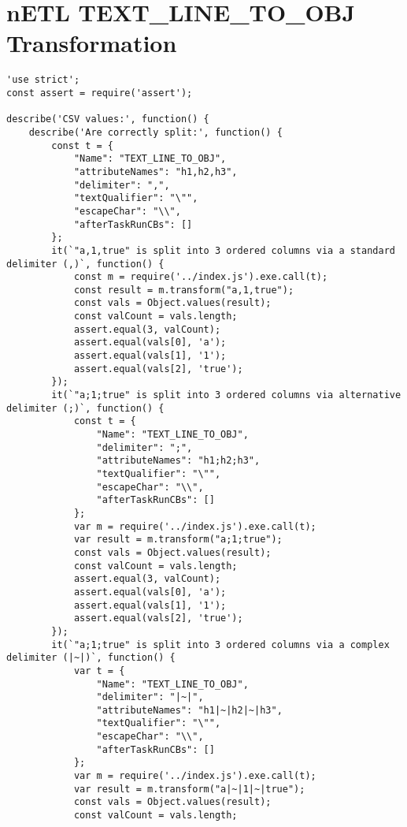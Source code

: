 \section{nETL TEXT\_LINE\_TO\_OBJ Transformation}
\label{TEXT_LINE_TO_OBJ-tests}
\begin{verbatim}
'use strict';
const assert = require('assert');

describe('CSV values:', function() {
    describe('Are correctly split:', function() {
        const t = {
            "Name": "TEXT_LINE_TO_OBJ",
            "attributeNames": "h1,h2,h3",
            "delimiter": ",",
            "textQualifier": "\"",
            "escapeChar": "\\",
            "afterTaskRunCBs": []
        };
        it(`"a,1,true" is split into 3 ordered columns via a standard delimiter (,)`, function() {
            const m = require('../index.js').exe.call(t);
            const result = m.transform("a,1,true");
            const vals = Object.values(result);
            const valCount = vals.length;
            assert.equal(3, valCount);
            assert.equal(vals[0], 'a');
            assert.equal(vals[1], '1');
            assert.equal(vals[2], 'true');
        });
        it(`"a;1;true" is split into 3 ordered columns via alternative delimiter (;)`, function() {
            const t = {
                "Name": "TEXT_LINE_TO_OBJ",
                "delimiter": ";",
                "attributeNames": "h1;h2;h3",
                "textQualifier": "\"",
                "escapeChar": "\\",
                "afterTaskRunCBs": []
            };
            var m = require('../index.js').exe.call(t);
            var result = m.transform("a;1;true");
            const vals = Object.values(result);
            const valCount = vals.length;
            assert.equal(3, valCount);
            assert.equal(vals[0], 'a');
            assert.equal(vals[1], '1');
            assert.equal(vals[2], 'true');
        });
        it(`"a;1;true" is split into 3 ordered columns via a complex delimiter (|~|)`, function() {
            var t = {
                "Name": "TEXT_LINE_TO_OBJ",
                "delimiter": "|~|",
                "attributeNames": "h1|~|h2|~|h3",
                "textQualifier": "\"",
                "escapeChar": "\\",
                "afterTaskRunCBs": []
            };
            var m = require('../index.js').exe.call(t);
            var result = m.transform("a|~|1|~|true");
            const vals = Object.values(result);
            const valCount = vals.length;

\end{verbatim}
